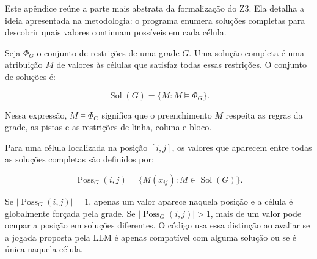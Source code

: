 
Este apêndice reúne a parte mais abstrata da formalização do Z3. Ela detalha a ideia apresentada na metodologia: o programa enumera soluções completas para descobrir quais valores continuam possíveis em cada célula.

Seja $\Phi_G$ o conjunto de restrições de uma grade $G$. Uma solução completa é uma atribuição $M$ de valores às células que satisfaz todas essas restrições. O conjunto de soluções é:

\[
\operatorname{Sol}(G)=\{M : M\models\Phi_G\}.
\]

Nessa expressão, $M\models\Phi_G$ significa que o preenchimento $M$ respeita as regras da grade, as pistas e as restrições de linha, coluna e bloco.

Para uma célula localizada na posição $[i,j]$, os valores que aparecem entre todas as soluções completas são definidos por:

\[
\operatorname{Poss}_G(i,j)=\{M(x_{ij}) : M\in\operatorname{Sol}(G)\}.
\]

Se $\left|\operatorname{Poss}_G(i,j)\right|=1$, apenas um valor aparece naquela posição e a célula é globalmente forçada pela grade. Se $\left|\operatorname{Poss}_G(i,j)\right|>1$, mais de um valor pode ocupar a posição em soluções diferentes. O código usa essa distinção ao avaliar se a jogada proposta pela LLM é apenas compatível com alguma solução ou se é única naquela célula.
